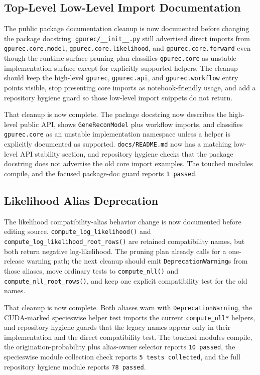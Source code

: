 \documentclass[11pt]{article}
\begin{document}
\subsection{Top-Level Low-Level Import Documentation}

The public package documentation cleanup is now documented before changing the
package docstring.  \texttt{gpurec/\_\_init\_\_.py} still advertised direct
imports from \texttt{gpurec.core.model}, \texttt{gpurec.core.likelihood}, and
\texttt{gpurec.core.forward} even though the runtime-surface pruning plan
classifies \texttt{gpurec.core} as unstable implementation surface except for
explicitly supported helpers.  The cleanup should keep the high-level
\texttt{gpurec}, \texttt{gpurec.api}, and \texttt{gpurec.workflow} entry points
visible, stop presenting core imports as notebook-friendly usage, and add a
repository hygiene guard so those low-level import snippets do not return.

That cleanup is now complete.  The package docstring now describes the
high-level public API, shows \texttt{GeneReconModel} plus workflow imports, and
classifies \texttt{gpurec.core} as an unstable implementation namespace unless a
helper is explicitly documented as supported.  \texttt{docs/README.md} now has
a matching low-level API stability section, and repository hygiene checks that
the package docstring does not advertise the old core import examples.  The
touched modules compile, and the focused package-doc guard reports
\texttt{1 passed}.

\subsection{Likelihood Alias Deprecation}

The likelihood compatibility-alias behavior change is now documented before
editing source.  \texttt{compute\_log\_likelihood()} and
\texttt{compute\_log\_likelihood\_root\_rows()} are retained compatibility
names, but both return negative log-likelihood.  The pruning plan already calls
for a one-release warning path; the next cleanup should emit
\texttt{DeprecationWarning}s from those aliases, move ordinary tests to
\texttt{compute\_nll()} and \texttt{compute\_nll\_root\_rows()}, and keep one
explicit compatibility test for the old names.

That cleanup is now complete.  Both aliases warn with
\texttt{DeprecationWarning}, the CUDA-marked specieswise helper test imports the
current \texttt{compute\_nll*} helpers, and repository hygiene guards that the
legacy names appear only in their implementation and the direct compatibility
test.  The touched modules compile, the origination-probability plus
alias-owner selector reports \texttt{10 passed}, the specieswise module
collection check reports \texttt{5 tests collected}, and the full repository
hygiene module reports \texttt{78 passed}.
\end{document}
